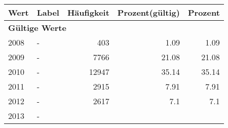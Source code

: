      \begin{longtable}{lXrrr}
     \toprule
     \textbf{Wert} & \textbf{Label} & \textbf{Häufigkeit} & \textbf{Prozent(gültig)} & \textbf{Prozent} \\
     \endhead
     \midrule
     \multicolumn{5}{l}{\textbf{Gültige Werte}}\\

     2008 &
     \multicolumn{1}{X}{ -  } &


       \num{403} &
       \num[round-mode=places,round-precision=2]{1.09} &
         \num[round-mode=places,round-precision=2]{1.09} \\

     2009 &
     \multicolumn{1}{X}{ -  } &


       \num{7766} &
       \num[round-mode=places,round-precision=2]{21.08} &
         \num[round-mode=places,round-precision=2]{21.08} \\

     2010 &
     \multicolumn{1}{X}{ -  } &


       \num{12947} &
       \num[round-mode=places,round-precision=2]{35.14} &
         \num[round-mode=places,round-precision=2]{35.14} \\

     2011 &
     \multicolumn{1}{X}{ -  } &


       \num{2915} &
       \num[round-mode=places,round-precision=2]{7.91} &
         \num[round-mode=places,round-precision=2]{7.91} \\

     2012 &
     \multicolumn{1}{X}{ -  } &


       \num{2617} &
       \num[round-mode=places,round-precision=2]{7.1} &
         \num[round-mode=places,round-precision=2]{7.1} \\

     2013 &
     \multicolumn{1}{X}{ -  } &



\end{longtable}
